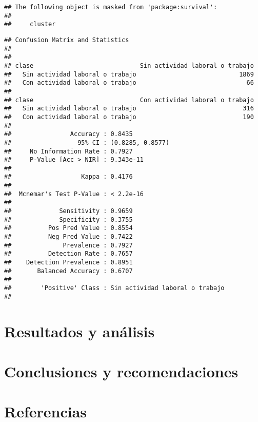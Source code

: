 \documentclass[
]{article}
\newenvironment{Shaded}{\begin{snugshade}}{\end{snugshade}}
\newcommand{\FunctionTok}[1]{\textcolor[rgb]{0.00,0.00,0.00}{#1}}
\newcommand{\NormalTok}[1]{#1}
\newcommand{\SpecialCharTok}[1]{\textcolor[rgb]{0.00,0.00,0.00}{#1}}
\begin{document}
\begin{verbatim}
## The following object is masked from 'package:survival':
## 
##     cluster
\end{verbatim}

\begin{Shaded}
\end{Shaded}

\begin{verbatim}
## Confusion Matrix and Statistics
## 
##                                  
## clase                             Sin actividad laboral o trabajo
##   Sin actividad laboral o trabajo                            1869
##   Con actividad laboral o trabajo                              66
##                                  
## clase                             Con actividad laboral o trabajo
##   Sin actividad laboral o trabajo                             316
##   Con actividad laboral o trabajo                             190
##                                                          
##                Accuracy : 0.8435                         
##                  95% CI : (0.8285, 0.8577)               
##     No Information Rate : 0.7927                         
##     P-Value [Acc > NIR] : 9.343e-11                      
##                                                          
##                   Kappa : 0.4176                         
##                                                          
##  Mcnemar's Test P-Value : < 2.2e-16                      
##                                                          
##             Sensitivity : 0.9659                         
##             Specificity : 0.3755                         
##          Pos Pred Value : 0.8554                         
##          Neg Pred Value : 0.7422                         
##              Prevalence : 0.7927                         
##          Detection Rate : 0.7657                         
##    Detection Prevalence : 0.8951                         
##       Balanced Accuracy : 0.6707                         
##                                                          
##        'Positive' Class : Sin actividad laboral o trabajo
## 
\end{verbatim}

\hypertarget{resultados-y-anuxe1lisis}{%
\section{Resultados y análisis}\label{resultados-y-anuxe1lisis}}

\hypertarget{conclusiones-y-recomendaciones}{%
\section{Conclusiones y
recomendaciones}\label{conclusiones-y-recomendaciones}}

\hypertarget{referencias}{%
\section{Referencias}\label{referencias}}
\end{document}
